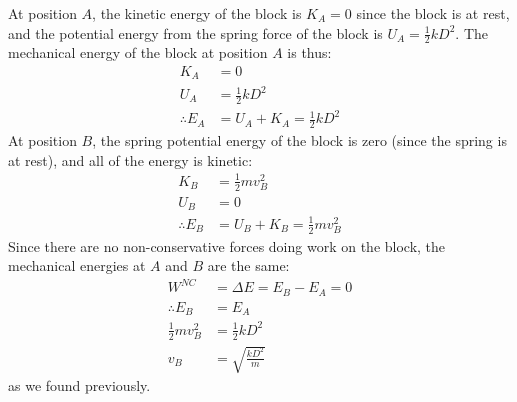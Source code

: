 \begin{example}
At position $A$, the kinetic energy of the block is $K_A=0$ since the block is at rest, and the potential energy from the spring force of the block is $U_A=\frac{1}{2}kD^2$. The mechanical energy of the block at position $A$ is thus:
\begin{align*}
K_A&=0\\
U_A&=\frac{1}{2}kD^2\\
\therefore E_A &= U_A + K_A = \frac{1}{2}kD^2
\end{align*}
At position $B$, the spring potential energy of the block is zero (since the spring is at rest), and all of the energy is kinetic:
\begin{align*}
K_B&=\frac{1}{2}mv_B^2\\
U_B&=0\\
\therefore E_B &= U_B+K_B=\frac{1}{2}mv_B^2
\end{align*}
Since there are no non-conservative forces doing work on the block, the mechanical energies at $A$ and $B$ are the same:
\begin{align*}
W^{NC}&=\Delta E=E_B-E_A= 0\\
\therefore E_B&=E_A\\
\frac{1}{2}mv_B^2&= \frac{1}{2}kD^2\\
 v_B &= \sqrt{\frac{kD^2}{m}}
\end{align*}
as we found previously.
\end{example}

